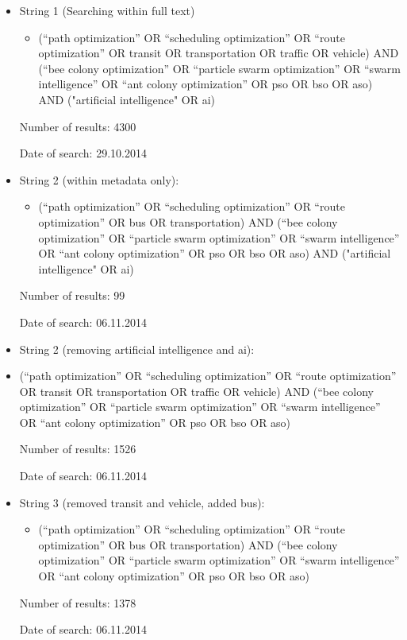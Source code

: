 \begin{itemize}
\item String 1 (Searching within full text)
\begin{itemize}
\item(``path optimization'' OR ``scheduling optimization'' OR ``route optimization'' OR transit OR transportation OR traffic OR vehicle) AND (``bee colony optimization'' OR ``particle swarm optimization'' OR ``swarm intelligence'' OR ``ant colony optimization'' OR pso OR bso OR aso)  AND ("artificial intelligence" OR ai)
\end{itemize}
\par Number of results: 4300
\par Date of search: 29.10.2014
\item String 2 (within metadata only):
\begin{itemize}
\item(``path optimization'' OR ``scheduling optimization'' OR ``route optimization'' OR bus OR transportation) AND (``bee colony optimization'' OR ``particle swarm optimization'' OR ``swarm intelligence'' OR ``ant colony optimization'' OR pso OR bso OR aso)  AND ("artificial intelligence" OR ai) 
\end{itemize}
\par Number of results: 99
\par Date of search: 06.11.2014
\item String 2 (removing artificial intelligence and ai):
\item(``path optimization'' OR ``scheduling optimization'' OR ``route optimization'' OR transit OR transportation OR traffic OR vehicle) AND (``bee colony optimization'' OR ``particle swarm optimization'' OR ``swarm intelligence'' OR ``ant colony optimization'' OR pso OR bso OR aso)
\par Number of results: 1526
\par Date of search: 06.11.2014
\item String 3 (removed transit and vehicle, added bus):
\begin{itemize}
\item(``path optimization'' OR ``scheduling optimization'' OR ``route optimization'' OR bus OR transportation) AND (``bee colony optimization'' OR ``particle swarm optimization'' OR ``swarm intelligence'' OR ``ant colony optimization'' OR pso OR bso OR aso)
\end{itemize}
\par Number of results: 1378
\par Date of search: 06.11.2014

\end{itemize}
